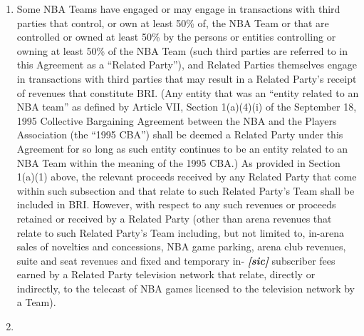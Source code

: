 \documentclass[
]{book}
\providecommand{\tightlist}{%
  \setlength{\itemsep}{0pt}\setlength{\parskip}{0pt}}
\begin{document}
\begin{enumerate}
\begin{enumerate}
    \begin{enumerate}
    \def\labelenumiii{(\roman{enumiii})}
    \tightlist
    \item
      Some NBA Teams have engaged or may engage in transactions with third parties that control, or own at least 50\% of, the NBA Team or that are controlled or owned at least 50\% by the persons or entities controlling or owning at least 50\% of the NBA Team (such third parties are referred to in this Agreement as a ``Related Party''), and Related Parties themselves engage in transactions with third parties that may result in a Related Party's receipt of revenues that constitute BRI. (Any entity that was an ``entity related to an NBA team'' as defined by Article VII, Section 1(a)(4)(i) of the September 18, 1995 Collective Bargaining Agreement between the NBA and the Players Association (the ``1995 CBA'') shall be deemed a Related Party under this Agreement for so long as such entity continues to be an entity related to an NBA Team within the meaning of the 1995 CBA.) As provided in Section 1(a)(1) above, the relevant proceeds received by any Related Party that come within such subsection and that relate to such Related Party's Team shall be included in BRI. However, with respect to any such revenues or proceeds retained or received by a Related Party (other than arena revenues that relate to such Related Party's Team including, but not limited to, in-arena sales of novelties and concessions, NBA game parking, arena club revenues, suite and seat revenues and fixed and temporary in- \textbf{\emph{{[}sic{]}}} subscriber fees earned by a Related Party television network that relate, directly or indirectly, to the telecast of NBA games licensed to the television network by a Team).
    \item

\end{enumerate}
\end{enumerate}
\end{enumerate}
\end{document}
